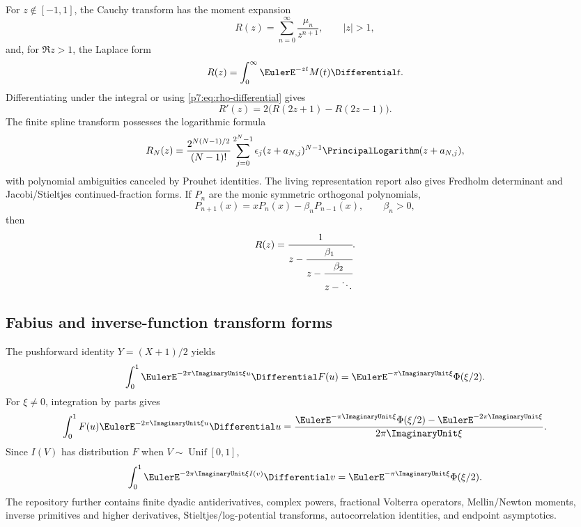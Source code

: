 \documentclass[11pt]{article}
\theoremstyle{definition}
\theoremstyle{remark}
\begin{document}
For \(z\notin[-1,1]\), the Cauchy transform has the moment expansion
\begin{equation}
 R(z)=\sum_{n=0}^{\infty}\frac{\mu_n}{z^{n+1}},\qquad |z|>1,
 \label{p7:eq:R-moment-series}
\end{equation}
and, for \(\Re z>1\), the Laplace form
\begin{equation}
 R(z)=\int_0^{\infty}\EulerE^{-zt}M(t)\Differential t.
 \label{p7:eq:R-Laplace}
\end{equation}
Differentiating under the integral or using \eqref{p7:eq:rho-differential} gives
\begin{equation}
 R'(z)=2\bigl(R(2z+1)-R(2z-1)\bigr).
 \label{p7:eq:R-differential}
\end{equation}
The finite spline transform possesses the logarithmic formula
\begin{equation}
 R_N(z)=\frac{2^{N(N-1)/2}}{(N-1)!}
 \sum_{j=0}^{2^N-1}\epsilon_j
 (z+a_{N,j})^{N-1}\PrincipalLogarithm(z+a_{N,j}),
 \label{p7:eq:finite-log-resolvent}
\end{equation}
with polynomial ambiguities canceled by Prouhet identities. The living representation
report also gives Fredholm determinant and Jacobi/Stieltjes continued-fraction forms. If
\(P_n\) are the monic symmetric orthogonal polynomials,
\begin{equation}
 P_{n+1}(x)=xP_n(x)-\beta_nP_{n-1}(x),\qquad \beta_n>0,
 \label{p7:eq:Jacobi-recurrence}
\end{equation}
then
\begin{equation}
 R(z)=\cfrac{1}{z-\cfrac{\beta_1}{z-\cfrac{\beta_2}{z-\ddots}}}.
 \label{p7:eq:Jacobi-CF}
\end{equation}

\subsection{Fabius and inverse-function transform forms}

The pushforward identity \(Y=(X+1)/2\) yields
\begin{equation}
 \int_0^1\EulerE^{-2\pi\ImaginaryUnit\xi u}\Differential F(u)
 =\EulerE^{-\pi\ImaginaryUnit\xi}\Phi(\xi/2).
 \label{p7:eq:F-measure-transform}
\end{equation}
For \(\xi\ne0\), integration by parts gives
\begin{equation}
 \int_0^1F(u)\EulerE^{-2\pi\ImaginaryUnit\xi u}\Differential u
 =\frac{\EulerE^{-\pi\ImaginaryUnit\xi}\Phi(\xi/2)-\EulerE^{-2\pi\ImaginaryUnit\xi}}
 {2\pi\ImaginaryUnit\xi}.
 \label{p7:eq:F-function-transform}
\end{equation}
Since \(I(V)\) has distribution \(F\) when \(V\sim\operatorname{Unif}[0,1]\),
\begin{equation}
 \int_0^1\EulerE^{-2\pi\ImaginaryUnit\xi I(v)}\Differential v
 =\EulerE^{-\pi\ImaginaryUnit\xi}\Phi(\xi/2).
 \label{p7:eq:inverse-pushforward-transform}
\end{equation}
The repository further contains finite dyadic antiderivatives, complex powers, fractional
Volterra operators, Mellin/Newton moments, inverse primitives and higher derivatives,
Stieltjes/log-potential transforms, autocorrelation identities, and endpoint asymptotics.
\end{document}
